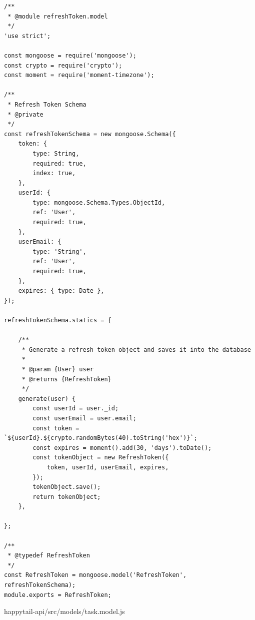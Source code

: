 \documentclass[12pt]{article}
\begin{document}
\begin{verbatim}
/**
 * @module refreshToken.model
 */
'use strict';

const mongoose = require('mongoose');
const crypto = require('crypto');
const moment = require('moment-timezone');

/**
 * Refresh Token Schema
 * @private
 */
const refreshTokenSchema = new mongoose.Schema({
    token: {
        type: String,
        required: true,
        index: true,
    },
    userId: {
        type: mongoose.Schema.Types.ObjectId,
        ref: 'User',
        required: true,
    },
    userEmail: {
        type: 'String',
        ref: 'User',
        required: true,
    },
    expires: { type: Date },
});

refreshTokenSchema.statics = {

    /**
     * Generate a refresh token object and saves it into the database
     *
     * @param {User} user
     * @returns {RefreshToken}
     */
    generate(user) {
        const userId = user._id;
        const userEmail = user.email;
        const token = `${userId}.${crypto.randomBytes(40).toString('hex')}`;
        const expires = moment().add(30, 'days').toDate();
        const tokenObject = new RefreshToken({
            token, userId, userEmail, expires,
        });
        tokenObject.save();
        return tokenObject;
    },

};

/**
 * @typedef RefreshToken
 */
const RefreshToken = mongoose.model('RefreshToken', refreshTokenSchema);
module.exports = RefreshToken;

 \end{verbatim}
  \normalsize
 happytail-api/src/models/task.model.js
 \footnotesize
\end{document}
